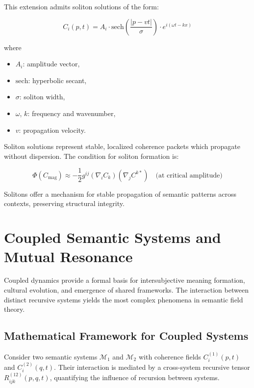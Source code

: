 This extension admits soliton solutions of the form:

\begin{equation}
C_i(p,t) = A_i \cdot \text{sech}\left(\frac{|p-vt|}{\sigma}\right) \cdot e^{i(\omega t - kx)}
\end{equation}

where

\begin{itemize}
    \item \(A_i\): amplitude vector,
    \item \(\text{sech}\): hyperbolic secant,
    \item \(\sigma\): soliton width,
    \item \(\omega\), \(k\): frequency and wavenumber,
    \item \(v\): propagation velocity.
\end{itemize}

Soliton solutions represent stable, localized coherence packets which propagate without dispersion. The condition for soliton formation is:

\begin{equation}
\Phi(C_{\mathrm{mag}}) \approx -\frac{1}{2}g^{ij}(\nabla_i C_k)(\nabla_j C^{k*}) \quad \text{(at critical amplitude)}
\end{equation}

Solitons offer a mechanism for stable propagation of semantic patterns across contexts, preserving structural integrity.

\section{Coupled Semantic Systems and Mutual Resonance}

Coupled dynamics provide a formal basis for intersubjective meaning formation, cultural evolution, and emergence of shared frameworks. The interaction between distinct recursive systems yields the most complex phenomena in semantic field theory.

\subsection{Mathematical Framework for Coupled Systems}

Consider two semantic systems \(\mathcal{M}_1\) and \(\mathcal{M}_2\) with coherence fields \(C^{(1)}_i(p,t)\) and \(C^{(2)}_i(q,t)\). Their interaction is mediated by a cross-system recursive tensor \(R^{(12)}_{ijk}(p,q,t)\), quantifying the influence of recursion between systems.

